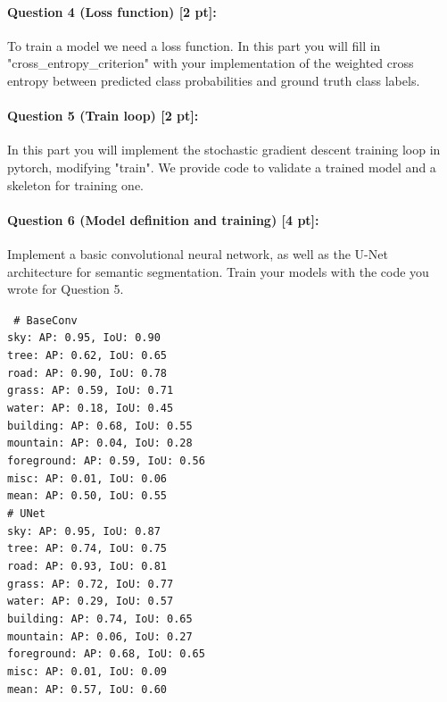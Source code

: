\documentclass[11pt]{article}
\begin{document}
\paragraph{Question 4 (Loss function) [2 pt]:} 
To train a model we need a loss function. In this part you will fill in "cross\_entropy\_criterion" with your implementation of the weighted cross entropy between predicted class probabilities and ground truth class labels.

\paragraph{Question 5 (Train loop) [2 pt]:} 
In this part you will implement the stochastic gradient descent training loop in pytorch, modifying "train". We provide code to validate a trained model and a skeleton for training one. 

\paragraph{Question 6 (Model definition and training) [4 pt]:} 
Implement a basic convolutional neural network, as well as the U-Net architecture for semantic segmentation. Train your models with the code you wrote for Question 5. 

{\centering \tt \small
\# BaseConv \\
sky: AP: 0.95, IoU: 0.90 \\
tree: AP: 0.62, IoU: 0.65 \\
road: AP: 0.90, IoU: 0.78 \\
grass: AP: 0.59, IoU: 0.71 \\
water: AP: 0.18, IoU: 0.45 \\
building: AP: 0.68, IoU: 0.55 \\
mountain: AP: 0.04, IoU: 0.28 \\
foreground: AP: 0.59, IoU: 0.56 \\
misc: AP: 0.01, IoU: 0.06 \\
mean: AP: 0.50, IoU: 0.55 \\

\# UNet \\
sky: AP: 0.95, IoU: 0.87 \\
tree: AP: 0.74, IoU: 0.75 \\
road: AP: 0.93, IoU: 0.81 \\
grass: AP: 0.72, IoU: 0.77 \\
water: AP: 0.29, IoU: 0.57 \\
building: AP: 0.74, IoU: 0.65 \\
mountain: AP: 0.06, IoU: 0.27 \\
foreground: AP: 0.68, IoU: 0.65 \\
misc: AP: 0.01, IoU: 0.09 \\
mean: AP: 0.57, IoU: 0.60 \\
}
\end{document}
